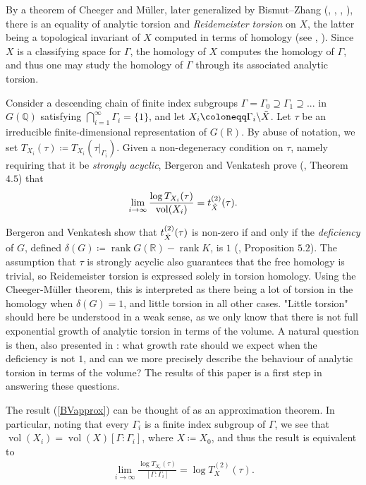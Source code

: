 \documentclass[11pt,reqno]{amsart}
\numberwithin{equation}{section}
\theoremstyle{definition}
\theoremstyle{remark}
\newcommand{\Q}{\mathbb{Q}}
\newcommand{\vol}{\operatorname{vol}}
\newcommand{\rank}{\operatorname{rank}}
\newcommand{\R}{\mathbb{R}}
\begin{document}
By a theorem of Cheeger and Müller, later generalized by Bismut--Zhang (\cite{Cheeger}, \cite{Müller1}, \cite{Müller2}, \cite{BZ}), there is an equality of analytic torsion and \textit{Reidemeister torsion} on $X$, the latter being a topological invariant of $X$ computed in terms of homology (see \cite{Reidemeister}, \cite{Franz}). Since $X$ is a classifying space for $\Gamma$, the homology of $X$ computes the homology of $\Gamma$, and thus one may study the homology of $\Gamma$ through its associated analytic torsion.

Consider a descending chain of finite index subgroups $\Gamma=\Gamma_0\supseteq\Gamma_1\supseteq...$ in $G(\Q)$ satisfying $\bigcap_{i=1}^\infty\Gamma_i = \lbrace1\rbrace$, and let $X_i\coloneqq \Gamma_i\backslash \Tilde{X}$. Let $\tau$ be an irreducible finite-dimensional representation of $G(\R)$. By abuse of notation, we set $T_{X_i}(\tau)\coloneqq T_{X_i}(\tau|_{\Gamma_i})$. Given a non-degeneracy condition on $\tau$, namely requiring that it be \textit{strongly acyclic}, Bergeron and Venkatesh prove (\cite{BV}, Theorem $4.5$) that
\begin{align}\label{BVapprox}
    \lim_{i\to\infty} \frac{\log T_{X_i}(\tau)}{\vol(X_i)} = t^{(2)}_{\Tilde{X}}(\tau).
\end{align}

\noindent Bergeron and Venkatesh show that $t^{(2)}_{\Tilde{X}}(\tau)$ is non-zero if and only if the \textit{deficiency} of $G$, defined $\delta(G)\coloneqq\rank G(\R)-\rank K$, is $1$ (\cite{BV}, Proposition $5.2$). The assumption that $\tau$ is strongly acyclic also guarantees that the free homology is trivial, so Reidemeister torsion is expressed solely in torsion homology. Using the Cheeger-Müller theorem, this is interpreted as there being a lot of torsion in the homology when $\delta(G)=1$, and little torsion in all other cases. "Little torsion" should here be understood in a weak sense, as we only know that there is not full exponential growth of analytic torsion in terms of the volume. A natural question is then, also presented in \cite{AGMY}: what growth rate should we expect when the deficiency is not $1$, and can we more precisely describe the behaviour of analytic torsion in terms of the volume? The results of this paper is a first step in answering these questions.

The result (\ref{BVapprox}) can be thought of as an approximation theorem. In particular, noting that every $\Gamma_i$ is a finite index subgroup of $\Gamma$, we see that $\vol(X_i)=\vol(X)[\Gamma:\Gamma_i]$, where $X\coloneqq X_0$, and thus the result is equivalent to 
\begin{align}
    \lim_{i\to\infty} \frac{\log T_{X_i}(\tau)}{[\Gamma:\Gamma_i]} = \log T^{(2)}_{X}(\tau).
\end{align}
\end{document}
